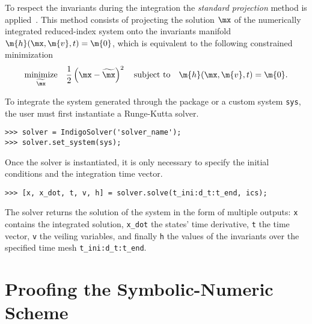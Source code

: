 To respect the invariants during the integration the \emph{standard projection} method is applied~\cite{hairer2000symmetric}. This method consists of projecting the solution $\mx$ of the numerically integrated reduced-index system onto the invariants manifold $\m{h}(\mx, \m{v}, t) = \m{0}$, which is equivalent to the following constrained minimization
%
\begin{equation}
  \underset{\widetilde{\mx}}{\textrm{minimize}} \quad \dfrac{1}{2}\left(\mx - \widetilde{\mx}\right)^2
    \quad \textrm{subject to} \quad
    \m{h}(\mx, \m{v}, t) = \m{0}.
\end{equation}

To integrate the system generated through the \Matlab{} package or a custom system \texttt{sys}, the user must first instantiate a \Indigo{} Runge-Kutta solver.
%
\begin{verbatim}
>>> solver = IndigoSolver('solver_name');
>>> solver.set_system(sys);
\end{verbatim}
%
Once the solver is instantiated, it is only necessary to specify the initial conditions and the integration time vector.
%
\begin{verbatim}
>>> [x, x_dot, t, v, h] = solver.solve(t_ini:d_t:t_end, ics);
\end{verbatim}
%
The solver returns the solution of the system in the form of multiple outputs: \texttt{x} contains the integrated solution, \texttt{x\_dot} the states' time derivative, \texttt{t} the time vector, \texttt{v} the veiling variables, and finally \texttt{h} the values of the invariants over the specified time mesh \texttt{t\_ini:d\_t:t\_end}.


\section{Proofing the Symbolic-Numeric Scheme}
\label{chap3:sec:examples}

